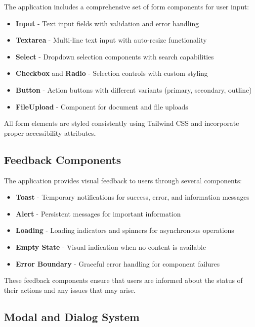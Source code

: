 The application includes a comprehensive set of form components for user input:

\begin{itemize}
  \item \textbf{Input} - Text input fields with validation and error handling
  \item \textbf{Textarea} - Multi-line text input with auto-resize functionality
  \item \textbf{Select} - Dropdown selection components with search capabilities
  \item \textbf{Checkbox} and \textbf{Radio} - Selection controls with custom styling
  \item \textbf{Button} - Action buttons with different variants (primary, secondary, outline)
  \item \textbf{FileUpload} - Component for document and file uploads
\end{itemize}

All form elements are styled consistently using Tailwind CSS and incorporate proper accessibility attributes.

\subsection{Feedback Components}

The application provides visual feedback to users through several components:

\begin{itemize}
  \item \textbf{Toast} - Temporary notifications for success, error, and information messages
  \item \textbf{Alert} - Persistent messages for important information
  \item \textbf{Loading} - Loading indicators and spinners for asynchronous operations
  \item \textbf{Empty State} - Visual indication when no content is available
  \item \textbf{Error Boundary} - Graceful error handling for component failures
\end{itemize}

These feedback components ensure that users are informed about the status of their actions and any issues that may arise.

\subsection{Modal and Dialog System}


